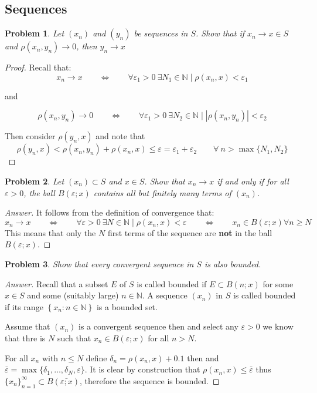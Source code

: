 \documentclass{article}
\newtheorem{problem}{Problem}[section]
\newcommand{\qiffq}{\qquad \iff \qquad}
\begin{document}
\subsection{Sequences}
\begin{problem}
    Let $\left(x_{n}\right)$ and $\left(y_{n}\right)$ be sequences in $S$. Show that if $x_{n} \rightarrow x \in S$ and $\rho\left(x_{n}, y_{n}\right) \rightarrow 0$, then $y_{n} \rightarrow x$
\end{problem}

\begin{proof}
    Recall that:
    $$x_n \to x \qiffq \forall\varepsilon_1 > 0 \: \exists N_1\in \mathbb{N} \mid \rho(x_n,x)< \varepsilon_1$$

    and 

    $$\rho(x_n,y_n) \to 0 \qiffq \forall\varepsilon_1 > 0 \: \exists N_2\in \mathbb{N} \mid |\rho(x_n,y_n)|< \varepsilon_2$$

    Then consider $\rho(y_n,x)$ and note that
    $$\rho(y_n,x)<\rho(x_n,y_n) + \rho(x_n,x) \leq \varepsilon = \varepsilon_1 + \varepsilon_2 \qquad \forall \:n > \max\{N_1,N_2\}$$
\end{proof}

\begin{problem}
    Let $\left(x_{n}\right) \subset S$ and $x \in S$. Show that $x_{n} \rightarrow x$ if and only if for all $\varepsilon>0$, the ball $B(\varepsilon ; x)$ contains all but finitely many terms of $\left(x_{n}\right)$.
\end{problem}

\begin{proof}[Answer]
    It follows from the definition of convergence that:
    $$x_n \to x \qiffq \forall \varepsilon > 0 \: \exists N \in \mathbb{N} \mid \rho(x_n,x)< \varepsilon \qiffq x_n \in B(\varepsilon; x) \forall n \geq N$$
    This means that only the $N$ first terms of the sequence are \textbf{not} in the ball $B(\varepsilon;x)$.
\end{proof}

\begin{problem}
    Show that every convergent sequence in $S$ is also bounded.
\end{problem}

\begin{proof}[Answer]
    Recall that a subset $E$ of $S$ is called bounded if $E \subset B(n ; x)$ for some $x \in S$ and some (suitably large) $n \in \mathbb{N}$. A sequence $\left(x_{n}\right)$ in $S$ is called bounded if its range $\left\{x_{n}: n \in \mathbb{N}\right\}$ is a bounded set.

    Assume that $(x_n)$ is a convergent sequence then and select any $\varepsilon>0$ we know that thre is $N$ such that $x_n\in B(\varepsilon; x)$ for all $n>N$.

    For all $x_n$ with $n\leq N$ define $\delta_n = \rho(x_n, x) + 0.1$ then and $\bar{\varepsilon} = \max\{\delta_1,\ldots,\delta_N,\varepsilon\}$. It is clear by construction that $\rho(x_n,x)\leq \bar{\varepsilon}$ thus $\{x_n\}_{n=1}^\infty \subset B(\bar{\varepsilon; x})$, therefore the sequence is bounded.
\end{proof}
\end{document}
